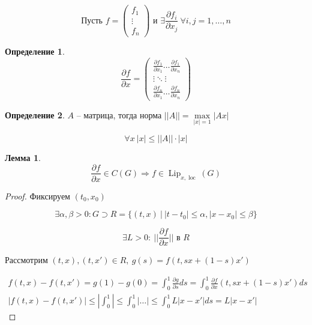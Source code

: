 \documentclass[a4paper]{article}
\theoremstyle{indented}
\newtheorem*{lemma}{Лемма}
\theoremstyle{definition}
\newtheorem*{defn}{Определение}
\theoremstyle{remark}
\DeclareMathOperator{\Lip}{Lip}
\DeclareMathOperator{\loc}{loc}
\begin{document}
\[\text{Пусть } f = \begin{pmatrix}
    f_1 \\
    \vdots \\
    f_n
  \end{pmatrix} \text{ и } \exists \frac{\partial f_i}{\partial x_j} \ \forall i,j = 1,\ldots,n\]

\begin{defn}

  \[\frac{\partial f}{\partial x} = \begin{pmatrix}
      \frac{\partial f_1}{\partial x_1} \ldots \frac{\partial f_1}{\partial x_n} \\
      \vdots \ddots \vdots \\
      \frac{\partial f_n}{\partial x_1} \ldots \frac{\partial f_n}{\partial x_n}
    \end{pmatrix}
  \]
\end{defn}

\begin{defn}
  $A$ -- матрица, тогда норма $||A|| = \max\limits_{|x| = 1} |Ax|$
\end{defn}
\[\forall x\ |x| \leqslant ||A|| \cdot |x|\]

\begin{lemma}
  \[\frac{\partial f}{\partial x} \in C(G) \Rightarrow f \in \Lip_{x,\loc}(G)  \]
\end{lemma}
\begin{proof}
  Фиксируем $(t_0,x_0)$

  \[\exists \alpha, \beta > 0 : G \supset R = \{(t,x) \ | \ |t-t_0| \leqslant \alpha, |x-x_0| \leqslant \beta\} \]

  \[\exists L > 0: \ ||\frac{\partial f}{\partial x}|| \text{ в } R  \]

  Рассмотрим $(t,x), (t,x') \in R, \ g(s) = f(t, sx + (1-s)x')$

  \begin{equation*}
    \begin{gathered}
      f(t,x) - f(t,x') = g(1) - g(0) = \int_{0}^{1}\frac{\partial g}{\partial s}ds  = \int_{0}^{1}\frac{\partial f}{\partial x}(t,sx + (1-s)x')ds \\
      |f(t,x) - f(t,x')| \leqslant |\int_{0}^{1}| \leqslant \int_{0}^{1}|\ldots| \leqslant \int_{0}^{1}L|x-x'|ds = L|x - x'|
    \end{gathered}
  \end{equation*}
  
\end{proof}
\end{document}
